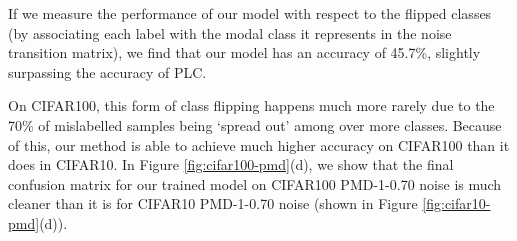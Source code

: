 \documentclass[10pt,twocolumn,letterpaper]{article}
\begin{document}
If we measure the performance of our model with respect to the flipped classes (by associating each label with the modal class it represents in the noise transition matrix), we find that our model has an accuracy of 45.7\%, slightly surpassing the accuracy of PLC.

On CIFAR100, this form of class flipping happens much more rarely due to the 70\% of mislabelled samples being `spread out' among over more classes. Because of this, our method is able to achieve much higher accuracy on CIFAR100 than it does in CIFAR10. In Figure \ref{fig:cifar100-pmd}(d), we show that the final confusion matrix for our trained model on CIFAR100 PMD-1-0.70 noise is much cleaner than it is for CIFAR10 PMD-1-0.70 noise (shown in Figure \ref{fig:cifar10-pmd}(d)).

\begin{table}[ht!]
    \begin{center}
    \end{center}
    \caption{Test accuracy (\%) for Polynomial Margin Diminishing Noise \cite{zhang2020learning}. Top methods are in \textbf{bold}.} 
    \label{tab:results_pmd_3}
\end{table}
\end{document}
